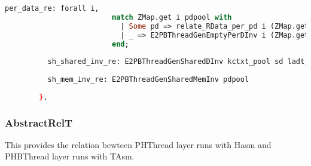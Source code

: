 \begin{lstlisting}[language=Caml]
          per_data_re: forall i,
                         match ZMap.get i pdpool with 
                           | Some pd => relate_RData_per_pd i (ZMap.get i kctxt_pool) sd pd ladt
                           | _ => E2PBThreadGenEmptyPerDInv i (ZMap.get i kctxt_pool)  sd ladt
                         end;
          
          sh_shared_inv_re: E2PBThreadGenSharedDInv kctxt_pool sd ladt;
          
          sh_mem_inv_re: E2PBThreadGenSharedMemInv pdpool 
                                                    
        }.
\end{lstlisting}

\subsubsection{AbstractRelT}

This provides the relation bewteen PHThread layer runs with Hasm and PHBThread layer runs with TAsm. 

